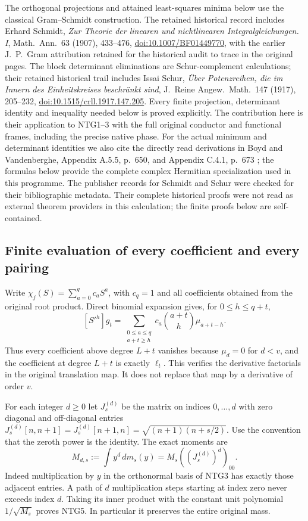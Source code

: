 The orthogonal projections and attained least-squares minima below
use the classical Gram--Schmidt construction. The retained historical
record includes Erhard Schmidt, \emph{Zur Theorie der linearen und
nichtlinearen Integralgleichungen. I}, Math.\ Ann.\ 63 (1907),
433--476,
\href{https://doi.org/10.1007/BF01449770}{doi:10.1007/BF01449770},
with the earlier J.\ P.\ Gram attribution retained for the historical
audit to trace in the original pages. The block determinant eliminations
are Schur-complement calculations; their retained historical trail includes
Issai Schur,
\emph{\"Uber Potenzreihen, die im Innern des Einheitskreises
beschr\"ankt sind}, J.\ Reine Angew.\ Math.\ 147 (1917), 205--232,
\href{https://doi.org/10.1515/crll.1917.147.205}
{doi:10.1515/crll.1917.147.205}.
Every finite projection, determinant identity and inequality
needed below is proved explicitly. The contribution here is their
application to NTG1--3 with the full original conductor and
functional frames, including the precise native phase.
For the actual minimum and determinant identities we also cite the
directly read derivations in Boyd and Vandenberghe,
Appendix A.5.5, p.~650, and Appendix C.4.1, p.~673
\cite{human:boyd-vandenberghe}; the formulas below provide the
complete complex Hermitian specialization used in this programme.
The publisher records for Schmidt and Schur were checked for
their bibliographic metadata. Their complete historical proofs
were not read as external theorem providers in this calculation;
the finite proofs below are self-contained.

\subsection{Finite evaluation of every coefficient and every pairing}
Write $\chi_j(S)=\sum_{a=0}^{q}c_aS^a$, with $c_q=1$ and all
coefficients obtained from the original root product. Direct
binomial expansion gives, for $0\le h\le q+t$,
\[
 [S'^h]g_t
   =\sum_{\substack{0\le a\le q\\a+t\ge h}}
             c_a\binom{a+t}{h}\mu_{a+t-h}.
                                                               \tag{NTG4}
\]
Thus every coefficient above degree $L+t$ vanishes because
$\mu_d=0$ for $d<v$, and the coefficient at degree $L+t$ is
exactly $\ell_t$. This verifies the derivative factorials in
the original translation map. It does not replace that map
by a derivative of order $v$.

For each integer $d\ge0$ let $J^{(d)}_s$ be the matrix on indices
$0,\ldots,d$ with zero diagonal and off-diagonal entries
$J_s^{(d)}[n,n+1]=J_s^{(d)}[n+1,n]=\sqrt{(n+1)(n+s/2)}$.
Use the convention that the zeroth power is the identity.
The exact moments are
\[
 M_{d,s}:=\int y^d\,dm_s(y)=M_s((J_s^{(d)})^d)_{00}.
                                                               \tag{NTG5}
\]
Indeed multiplication by $y$ in the orthonormal basis of NTG3
has exactly those adjacent entries. A path of $d$ multiplication
steps starting at index zero never exceeds index $d$.
Taking its inner product with the constant unit polynomial
$1/\sqrt{M_s}$ proves NTG5. In particular it preserves the
entire original mass.

